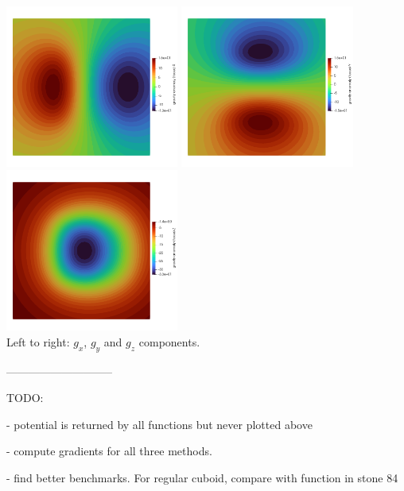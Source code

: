 \begin{center}
\includegraphics[width=5.7cm]{python_codes/fieldstone_113/results/hex_test5/gx}
\includegraphics[width=5.7cm]{python_codes/fieldstone_113/results/hex_test5/gy}
\includegraphics[width=5.7cm]{python_codes/fieldstone_113/results/hex_test5/gz}\\
{\captionfont Left to right: $g_x$, $g_y$ and $g_z$ components.}
\end{center}



-----------------------------

TODO:

- potential is returned by all functions but never plotted above

- compute gradients for all three methods.

- find better benchmarks. For regular cuboid, compare with function in stone 84

